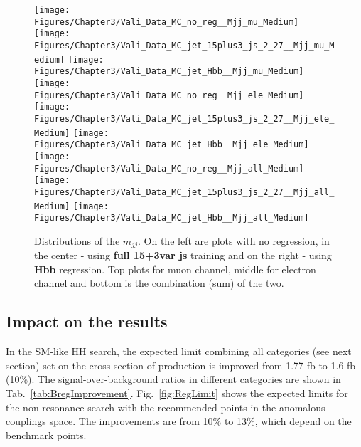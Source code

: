\begin{figure*}[thb]
  \centering
  \texttt{[image: Figures/Chapter3/Vali\_Data\_MC\_no\_reg\_\_Mjj\_mu\_Medium]}\hfil
  \texttt{[image: Figures/Chapter3/Vali\_Data\_MC\_jet\_15plus3\_js\_2\_27\_\_Mjj\_mu\_Medium]}\hfil
  \texttt{[image: Figures/Chapter3/Vali\_Data\_MC\_jet\_Hbb\_\_Mjj\_mu\_Medium]}\hfil\\
  \texttt{[image: Figures/Chapter3/Vali\_Data\_MC\_no\_reg\_\_Mjj\_ele\_Medium]}\hfil
  \texttt{[image: Figures/Chapter3/Vali\_Data\_MC\_jet\_15plus3\_js\_2\_27\_\_Mjj\_ele\_Medium]}\hfil
  \texttt{[image: Figures/Chapter3/Vali\_Data\_MC\_jet\_Hbb\_\_Mjj\_ele\_Medium]}\hfil\\
  \texttt{[image: Figures/Chapter3/Vali\_Data\_MC\_no\_reg\_\_Mjj\_all\_Medium]}\hfil
  \texttt{[image: Figures/Chapter3/Vali\_Data\_MC\_jet\_15plus3\_js\_2\_27\_\_Mjj\_all\_Medium]}\hfil
  \texttt{[image: Figures/Chapter3/Vali\_Data\_MC\_jet\_Hbb\_\_Mjj\_all\_Medium]}\hfil\\
  \caption{Distributions of the $m_{jj}$. On the left are plots with
    no regression, in the center - using \textbf{full 15+3var js}
    training and on the right - using \textbf{Hbb} regression.  Top
    plots for muon channel, middle for electron channel and bottom is
    the combination (sum) of the two.  }
  \label{fig:vali-Mjj}
\end{figure*}

\clearpage

\subsection{Impact on the results}

In the SM-like HH search, the expected limit combining all categories (see next section) set on the cross-section of production is improved from 1.77 fb to 1.6 fb (10\%).
The signal-over-background ratios in different categories are shown in Tab.~\ref{tab:BregImprovement}. %
Fig.~\ref{fig:RegLimit} shows the expected limits for the non-resonance search with the recommended points in the anomalous couplings space.
The improvements are from 10\% to 13\%, which depend on the benchmark points.


